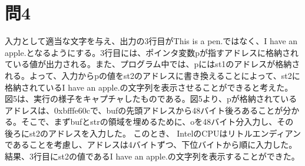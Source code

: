 \documentclass[dvipdfmx,autodetect-engine,titlepage]{jsarticle}
\begin{document}
\section*{問4}
入力として適当な文字を与え、出力の3行目がThis is a pen.ではなく、I have an apple.となるようにする。3行目には、ポインタ変数pが指すアドレスに格納されている値が出力される。また、プログラム中では、pにはst1のアドレスが格納される。よって、入力からpの値をst2のアドレスに書き換えることによって、st2に格納されているI have an apple.の文字列を表示させることができると考えた。
図5は、実行の様子をキャプチャしたものである。図5より、pが格納されているアドレスは、0xbfffe60cで、bufの先頭アドレスから48バイト後ろあることが分かる。そこで、まずbufとstrの領域を埋めるために、oを48バイト分入力し、その後ろにst2のアドレスを入力した。
このとき、 IntelのCPUはリトルエンディアンであることを考慮し、アドレスは4バイトずつ、下位バイトから順に入力した。
結果、3行目にst2の値であるI have an apple.の文字列を表示することができた。\\\\
\begin{figure}[H]
  \centering
  \caption{}\label{fig:図5}
\end{figure}
\end{document}
